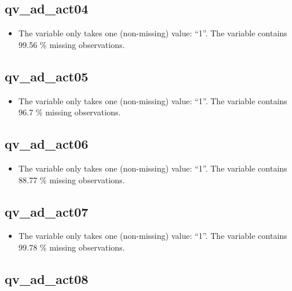 \documentclass[
  letterpaper,
  DIV=11,
  numbers=noendperiod]{scrartcl}
\providecommand{\tightlist}{%
  \setlength{\itemsep}{0pt}\setlength{\parskip}{0pt}}
\begin{document}
\fullline

\subsection{qv\_ad\_act04}\label{qv_ad_act04}

\begin{itemize}
\tightlist
\item
  The variable only takes one (non-missing) value: ``1''. The variable
  contains 99.56 \% missing observations.
\end{itemize}

\fullline

\subsection{qv\_ad\_act05}\label{qv_ad_act05}

\begin{itemize}
\tightlist
\item
  The variable only takes one (non-missing) value: ``1''. The variable
  contains 96.7 \% missing observations.
\end{itemize}

\fullline

\subsection{qv\_ad\_act06}\label{qv_ad_act06}

\begin{itemize}
\tightlist
\item
  The variable only takes one (non-missing) value: ``1''. The variable
  contains 88.77 \% missing observations.
\end{itemize}

\fullline

\subsection{qv\_ad\_act07}\label{qv_ad_act07}

\begin{itemize}
\tightlist
\item
  The variable only takes one (non-missing) value: ``1''. The variable
  contains 99.78 \% missing observations.
\end{itemize}

\fullline

\subsection{qv\_ad\_act08}\label{qv_ad_act08}
\end{document}
